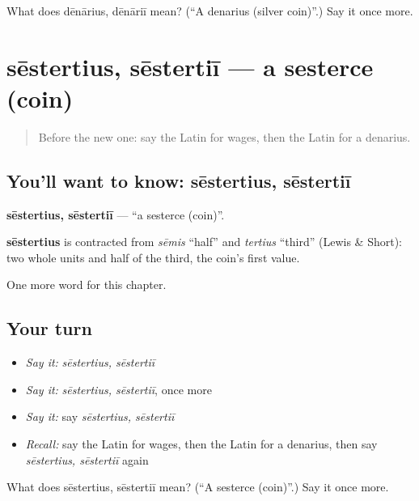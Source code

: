 \begin{tcolorbox}[breakable,colback=teal!4,colframe=teal!35!black,title={Before you move on}]
What does dēnārius, dēnāriī mean? (\textquotedblleft{}A denarius (silver coin)\textquotedblright{}.) Say it once more.
\end{tcolorbox}
\section[sēstertius, sēstertiī]{sēstertius, sēstertiī — a sesterce (coin)}

\label{lesson:LA-C190-sestertius}



\begin{quote}
Before the new one: say the Latin for wages, then the Latin for a denarius.
\end{quote}

\subsection*{You'll want to know: sēstertius, sēstertiī}
\textbf{sēstertius, sēstertiī} — \textquotedblleft{}a sesterce (coin)\textquotedblright{}.

\begin{cousinweb}
\textbf{sēstertius} is contracted from \emph{sēmis} \textquotedblleft{}half\textquotedblright{} and \emph{tertius} \textquotedblleft{}third\textquotedblright{} (Lewis \& Short): two whole units and half of the third, the coin's first value.
\end{cousinweb}

\begin{grammarlens}[title={What you've built}]
One more word for this chapter.
\end{grammarlens}

\subsection*{Your turn}
\begin{itemize}
\raggedright
  \item \emph{Say it:} \emph{sēstertius, sēstertiī}
  \item \emph{Say it:} \emph{sēstertius, sēstertiī}, once more
  \item \emph{Say it:} say \emph{sēstertius, sēstertiī}
  \item \emph{Recall:} say the Latin for wages, then the Latin for a denarius, then say \emph{sēstertius, sēstertiī} again
\end{itemize}

\begin{tcolorbox}[breakable,colback=teal!4,colframe=teal!35!black,title={Before you move on}]
What does sēstertius, sēstertiī mean? (\textquotedblleft{}A sesterce (coin)\textquotedblright{}.) Say it once more.
\end{tcolorbox}
